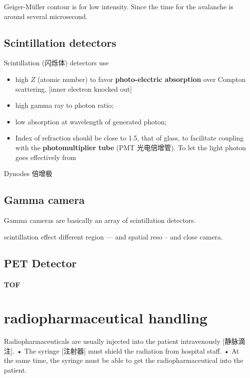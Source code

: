 \documentclass[UTF8,a4paper,11pt]{book}
\theoremstyle{mystyle}{
  \newtheorem{example}{Example}
}
\begin{document}
Geiger-M\"{u}ller contour is for low intensity. Since the time for
the avalanche is around several microsecond.

\subsection{Scintillation detectors}
Scintillation (闪烁体) detectors use

\begin{itemize}
\item high $Z$ (atomic number) to favor 
\textbf{photo-electric absorption} over Compton scattering, [inner electron
knocked out]
\item high {\sf gamma ray to photon ratio};
\item low absorption at wavelength of generated photon;
\item Index of refraction should be close to 1.5, that of glass, to facilitate coupling with the \textbf{photomultiplier tube} (PMT 光电倍增管). To let the light photon goes effectively from 
\end{itemize}


Dynodes 倍增极

\subsection{Gamma camera}
Gamma cameras are basically an array of scintillation detectors.

scintillation effect different region --- and spatial reso -- and close camera.


\subsection{PET Detector}

\paragraph{TOF}



\section{radiopharmaceutical handling}
Radiopharmaceuticals are usually injected into
the patient intravenously [静脉滴注].
• The syringe [注射器] must shield the radiation from
hospital staff.
• At the same time, the syringe must be able to
get the radiopharmaceutical into the patient.
\end{document}
